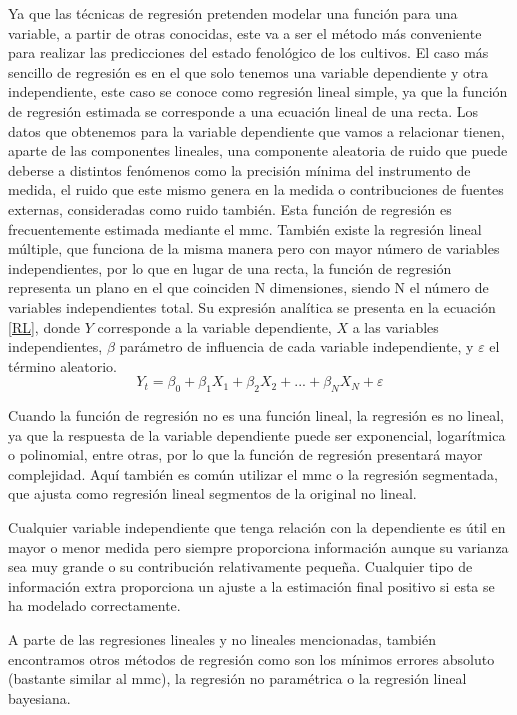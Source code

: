 \par Ya que las técnicas de regresión pretenden modelar una función para una variable, a partir de otras conocidas, este va a ser el método más conveniente para realizar las predicciones del estado fenológico de los cultivos. El caso más sencillo de regresión es en el que solo tenemos una variable dependiente y otra independiente, este caso se conoce como regresión lineal simple, ya que la función de regresión estimada se corresponde a una ecuación lineal de una recta. Los datos que obtenemos para la variable dependiente que vamos a relacionar tienen, aparte de las componentes lineales, una componente aleatoria de ruido que puede deberse a distintos fenómenos como la precisión mínima del instrumento de medida, el ruido que este mismo genera en la medida o contribuciones de fuentes externas, consideradas como ruido también. Esta función de regresión es frecuentemente estimada mediante el \gls{mmc}. También existe la regresión lineal múltiple, que funciona de la misma manera pero con mayor número de variables independientes, por lo que en lugar de una recta, la función de regresión representa un plano en el que coinciden N dimensiones, siendo N el número de variables independientes total. Su expresión analítica se presenta en la ecuación \ref{RL}, donde $Y$ corresponde a la variable dependiente, $X$ a las variables independientes, $\beta$ parámetro de influencia de cada variable independiente, y $\varepsilon$ el término aleatorio.
\\
\begin{equation} \label{RL}
Y_{t}=\beta _{0}+\beta _{1} X_{1}+\beta _{2} X_{2}+...+\beta _{N} X_{N}+\varepsilon 
\end{equation}
\par Cuando la función de regresión no es una función lineal, la regresión es no lineal, ya que la respuesta de la variable dependiente puede ser exponencial, logarítmica o polinomial, entre otras, por lo que la función de regresión presentará mayor complejidad. Aquí también es común utilizar el \gls{mmc} o la regresión segmentada, que ajusta como regresión lineal segmentos de la original no lineal.
\\
\par Cualquier variable independiente que tenga relación con la dependiente es útil en mayor o menor medida pero siempre proporciona información aunque su varianza sea muy grande o su contribución relativamente pequeña. Cualquier tipo de información extra proporciona un ajuste a la estimación final positivo si esta se ha modelado correctamente. 
\\
\par A parte de las regresiones lineales y no lineales mencionadas, también encontramos otros métodos de regresión como son los mínimos errores absoluto (bastante similar al \gls{mmc}), la regresión no paramétrica o la regresión lineal bayesiana.

